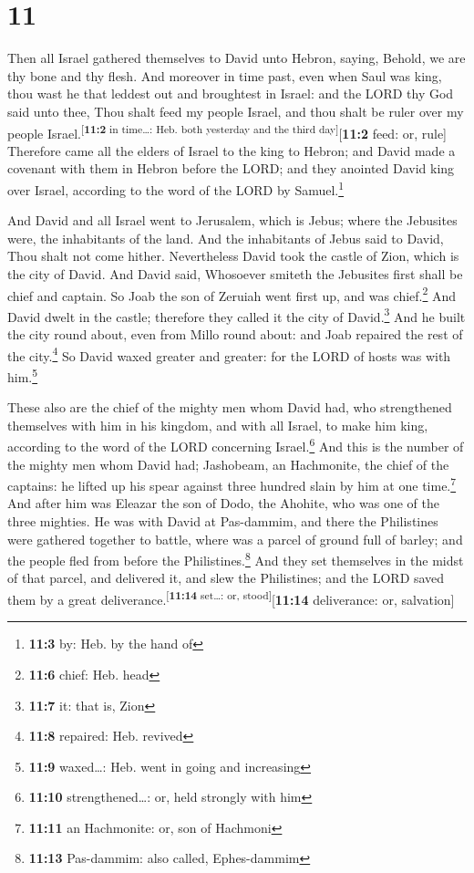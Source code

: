 \hypertarget{section-10}{%
\section{11}\label{section-10}}

 Then all Israel gathered themselves to David unto Hebron,
saying, Behold, we are thy bone and thy flesh.  And
moreover in time past, even when Saul was king, thou wast he that
leddest out and broughtest in Israel: and the LORD thy God said unto
thee, Thou shalt feed my people Israel, and thou shalt be ruler over my
people Israel.\textsuperscript{{[}\textbf{11:2} in time\ldots: Heb. both
yesterday and the third day{]}}{[}\textbf{11:2} feed: or, rule{]}
 Therefore came all the elders of Israel to the king to
Hebron; and David made a covenant with them in Hebron before the LORD;
and they anointed David king over Israel, according to the word of the
LORD by Samuel.\footnote{\textbf{11:3} by: Heb. by the hand of}

 And David and all Israel went to Jerusalem, which is
Jebus; where the Jebusites were, the inhabitants of the land.
 And the inhabitants of Jebus said to David, Thou shalt
not come hither. Nevertheless David took the castle of Zion, which is
the city of David.  And David said, Whosoever smiteth the
Jebusites first shall be chief and captain. So Joab the son of Zeruiah
went first up, and was chief.\footnote{\textbf{11:6} chief: Heb. head}
 And David dwelt in the castle; therefore they called it
the city of David.\footnote{\textbf{11:7} it: that is, Zion}
 And he built the city round about, even from Millo round
about: and Joab repaired the rest of the city.\footnote{\textbf{11:8}
  repaired: Heb. revived}  So David waxed greater and
greater: for the LORD of hosts was with him.\footnote{\textbf{11:9}
  waxed\ldots: Heb. went in going and increasing}

 These also are the chief of the mighty men whom David
had, who strengthened themselves with him in his kingdom, and with all
Israel, to make him king, according to the word of the LORD concerning
Israel.\footnote{\textbf{11:10} strengthened\ldots: or, held strongly
  with him}  And this is the number of the mighty men
whom David had; Jashobeam, an Hachmonite, the chief of the captains: he
lifted up his spear against three hundred slain by him at one
time.\footnote{\textbf{11:11} an Hachmonite: or, son of Hachmoni}
 And after him was Eleazar the son of Dodo, the Ahohite,
who was one of the three mighties.  He was with David at
Pas-dammim, and there the Philistines were gathered together to battle,
where was a parcel of ground full of barley; and the people fled from
before the Philistines.\footnote{\textbf{11:13} Pas-dammim: also called,
  Ephes-dammim}  And they set themselves in the midst of
that parcel, and delivered it, and slew the Philistines; and the LORD
saved them by a great deliverance.\textsuperscript{{[}\textbf{11:14}
set\ldots: or, stood{]}}{[}\textbf{11:14} deliverance: or, salvation{]}

